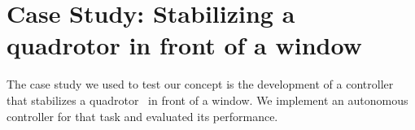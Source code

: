 \documentclass{sig-alternate-ipsn13}
\begin{document}
%    
%    
%    
%
%


\section{Case Study: Stabilizing a quadrotor in front of a window}
\label{sec:caseStady}

The case study we used to test our concept is the development of a controller that stabilizes a quadrotor~\cite{?} in front of a window.
We implement an autonomous controller for that task and evaluated its performance.
\end{document}
